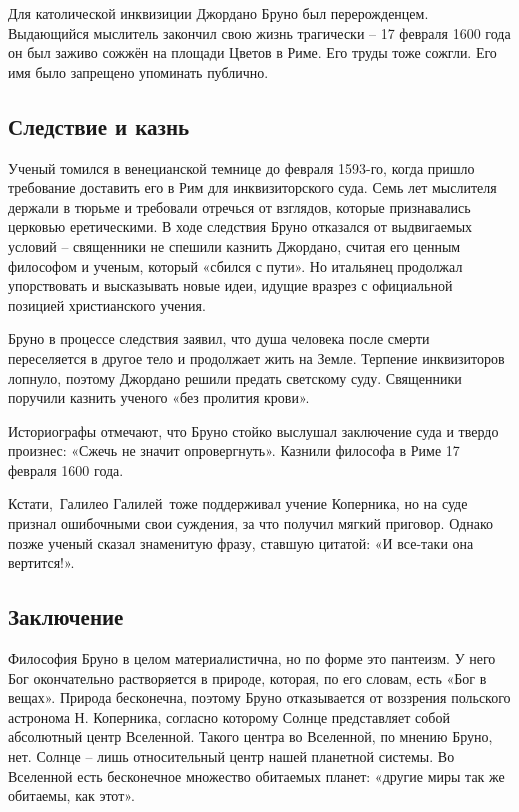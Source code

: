 \documentclass[a4paper, 14pt]{extreport}
\begin{document}
Для католической инквизиции Джордано Бруно был перерожденцем. Выдающийся
мыслитель закончил свою жизнь трагически -- 17 февраля 1600 года он был
заживо сожжён на площади Цветов в Риме. Его труды тоже сожгли. Его имя
было запрещено упоминать публично.

\subsection{Следствие и казнь}

Ученый томился в венецианской темнице до февраля 1593-го, когда пришло
требование доставить его в Рим для инквизиторского суда. Семь лет
мыслителя держали в тюрьме и требовали отречься от взглядов, которые
признавались церковью еретическими. В ходе следствия Бруно отказался от
выдвигаемых условий -- священники не спешили казнить Джордано, считая
его ценным философом и ученым, который «сбился с пути». Но итальянец
продолжал упорствовать и высказывать новые идеи, идущие вразрез с
официальной позицией христианского учения.

Бруно в процессе следствия заявил, что душа человека после смерти
переселяется в другое тело и продолжает жить на Земле. Терпение
инквизиторов лопнуло, поэтому Джордано решили предать светскому суду.
Священники поручили казнить ученого «без пролития крови».

Историографы отмечают, что Бруно стойко выслушал заключение суда и
твердо произнес: «Сжечь не значит опровергнуть». Казнили философа в Риме
17 февраля 1600 года.

Кстати,~Галилео Галилей~тоже поддерживал учение Коперника, но на суде
признал ошибочными свои суждения, за что получил мягкий приговор. Однако
позже ученый сказал знаменитую фразу, ставшую цитатой: «И все-таки она
вертится!».

\subsection{Заключение}

Философия Бруно в целом материалистична, но по форме это пантеизм. У
него Бог окончательно растворяется в природе, которая, по его словам,
есть «Бог в вещах». Природа бесконечна, поэтому Бруно отказывается от
воззрения польского астронома Н. Коперника, согласно которому Солнце
представляет собой абсолютный центр Вселенной. Такого центра во
Вселенной, по мнению Бруно, нет. Солнце -- лишь относительный центр
нашей планетной системы. Во Вселенной есть бесконечное множество
обитаемых планет: «другие миры так же обитаемы, как этот».
\end{document}
